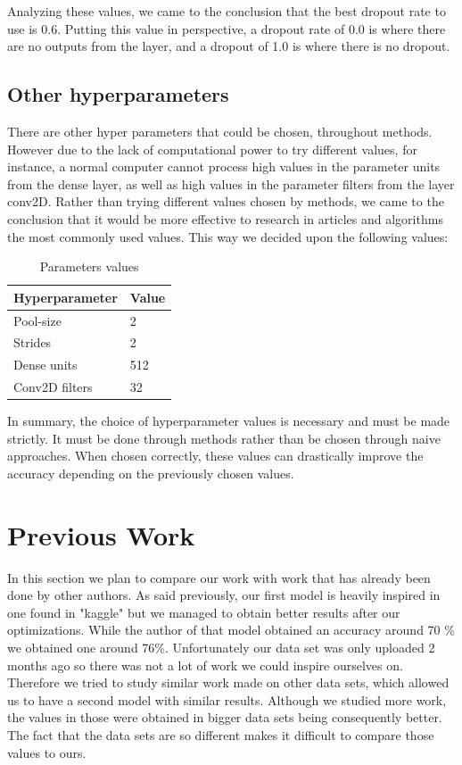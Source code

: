 \documentclass[conference]{IEEEtran}
\begin{document}
Analyzing these values, we came to the conclusion that the best dropout rate to use is 0.6. Putting this value in perspective, a dropout rate of 0.0 is where there are no outputs from the layer, and a dropout of 1.0 is where there is no dropout.

\subsection{Other hyperparameters}
There are other hyper parameters that could be chosen, throughout methods. However due to the lack of computational power to try different values, for instance, a normal computer cannot process high values in the parameter units from the dense layer, as well as high values in the parameter filters from the layer conv2D. Rather than trying different values chosen by methods, we came to the conclusion that it would be more effective to research in articles and algorithms the most commonly used values. This way we decided upon the following values:

\begin{table}[H]
\centering
\caption{Parameters values}
\begin{tabular}{ | m{7em} | m{1cm} | } 
\hline
Hyperparameter & Value\\ 
\hline
Pool-size & 2 \\
\hline
Strides & 2 \\
\hline
Dense units & 512 \\
\hline
Conv2D filters & 32\\
\hline
\end{tabular}
\end{table}

In summary, the choice of hyperparameter values is necessary and must be made strictly. It must be done through methods rather than be chosen through naive approaches. When chosen correctly, these values can drastically improve the accuracy depending on the previously chosen values.

\section{Previous Work}
In this section we plan to compare our work with work that has already been done by other authors. As said previously, our first model is heavily inspired in one found in "kaggle" but we managed to obtain better results after our optimizations. While the author of that model obtained an accuracy around 70 \% we obtained one around 76\%. Unfortunately our data set was only uploaded 2 months ago so there was not a lot of work we could inspire ourselves on. Therefore we tried to study similar work made on other data sets, which allowed us to have a second model with similar results. Although we studied more work, the values in those were obtained in bigger data sets being consequently better. The fact that the data sets are so different makes it difficult to compare those values to ours.
\end{document}
